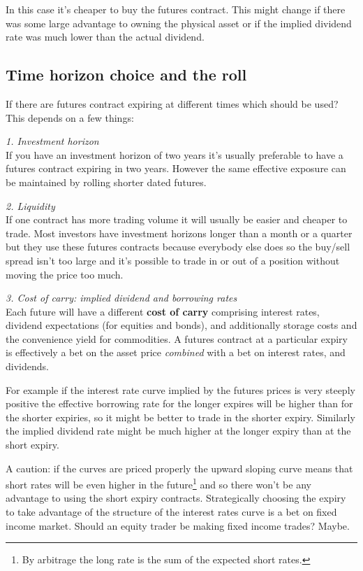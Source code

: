 \documentclass{tran-l}
\theoremstyle{definition}
\theoremstyle{remark}
\numberwithin{equation}{subsection}
\begin{document}
In this case it's cheaper to buy the futures contract. This might change if there was some large advantage to owning the physical asset or if the implied dividend rate was much lower than the actual dividend.


\subsection{Time horizon choice and the roll} 

If there are futures contract expiring at different times which should be used? This depends on a few things:  

\medskip \textit{1. Investment horizon}\\

If you have an investment horizon of two years it's usually preferable to have a futures contract expiring in two years. However the same effective exposure can be maintained by rolling shorter dated futures. 

\medskip \textit{2. Liquidity}\\

If one contract has more trading volume it will usually be easier and cheaper to trade. Most investors have investment horizons longer than a month or a quarter but they use these futures contracts because everybody else does so the buy/sell spread isn't too large and it's possible to trade in or out of a position without moving the price too much.

\medskip \textit{3. Cost of carry: implied dividend and borrowing rates}\\

Each future will have a different \textbf{cost of carry} comprising interest rates, dividend expectations (for equities and bonds), and additionally storage costs and the convenience yield for commodities. A futures contract at a particular expiry is effectively a bet on the asset price \textit{combined} with a bet on interest rates, and dividends.

For example if the interest rate curve implied by the futures prices is very steeply positive the effective borrowing rate for the longer expires will be higher than for the shorter expiries, so it might be better to trade in the shorter expiry. Similarly the implied dividend rate might be much higher at the longer expiry than at the short expiry. 

A caution: if the curves are priced properly the upward sloping curve means that short rates will be even higher in the future\footnote{By arbitrage the long rate is the sum of the expected short rates.} and so there won't be any advantage to using the short expiry contracts. Strategically choosing the expiry to take advantage of the structure of the interest rates curve is a bet on fixed income market. Should an equity trader be making fixed income trades? Maybe. 
\end{document}
